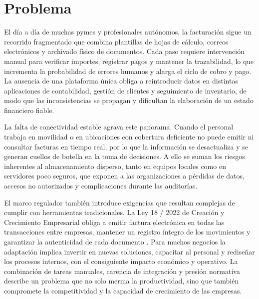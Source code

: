 
\section{Problema}
\begin{large}
El día a día de muchas pymes y profesionales autónomos, la facturación sigue un recorrido fragmentado que combina plantillas de hojas de cálculo, correos electrónicos y archivado físico de documentos. Cada paso requiere intervención manual para verificar importes, registrar pagos y mantener la trazabilidad, lo que incrementa la probabilidad de errores humanos y alarga el ciclo de cobro y pago. La ausencia de una plataforma única obliga a reintroducir datos en distintas aplicaciones de contabilidad, gestión de clientes y seguimiento de inventario, de modo que las inconsistencias se propagan y dificultan la elaboración de un estado financiero fiable.

La falta de conectividad estable agrava este panorama. Cuando el personal trabaja en movilidad o en ubicaciones con cobertura deficiente no puede emitir ni consultar facturas en tiempo real, por lo que la información se desactualiza y se generan cuellos de botella en la toma de decisiones. A ello se suman los riesgos inherentes al almacenamiento disperso, tanto en equipos locales como en servidores poco seguros, que exponen a las organizaciones a pérdidas de datos, accesos no autorizados y complicaciones durante las auditorías.

El marco regulador también introduce exigencias que resultan complejas de cumplir con herramientas tradicionales. La Ley 18 / 2022 de Creación y Crecimiento Empresarial obliga a emitir factura electrónica en todas las transacciones entre empresas, mantener un registro íntegro de los movimientos y garantizar la autenticidad de cada documento \cite{ley18_2022}. Para muchos negocios la adaptación implica invertir en nuevas soluciones, capacitar al personal y rediseñar los procesos internos, con el consiguiente impacto económico y operativo. La combinación de tareas manuales, carencia de integración y presión normativa describe un problema que no solo merma la productividad, sino que también compromete la competitividad y la capacidad de crecimiento de las empresas.
\end{large}

